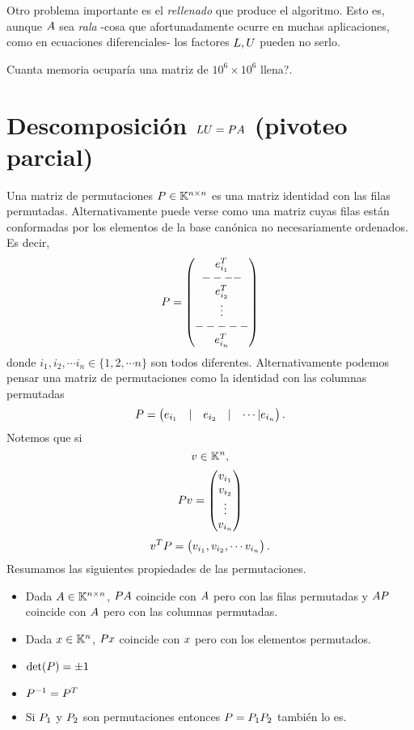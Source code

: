 \begin{tcolorbox}
Otro problema importante es el \emph{rellenado} que produce el algoritmo. Esto es, aunque $\Ab$ sea \emph{rala} -cosa que afortunadamente ocurre en muchas aplicaciones, como en ecuaciones diferenciales- los factores $\Lb,\Ub$ pueden no serlo.

\begin{ej}
 Cuanta memoria ocuparía una matriz
 de $10^6\times 10^6$ llena?.
\end{ej}



\section{Descomposición $\Lb\Ub=\Pb\Ab$ (pivoteo parcial)}

Una matriz de permutaciones $\Pb\in \Knn$
es una matriz identidad con las filas permutadas. Alternativamente puede verse como una matriz cuyas filas están conformadas por los elementos de la base canónica no necesariamente ordenados. Es decir,
$$
\Pb=
\begin{pmatrix}
 \eb_{i_1}^T \\
 ---- \\
 \eb_{i_2}^T\\
 \vdots

 \\
 -----\\
 \eb_{i_n}^T
\end{pmatrix}
$$
donde $i_1,i_2,\cdots i_n\in \{1,2,\cdots n\}$ son todos diferentes. Alternativamente podemos pensar una matriz de permutaciones como la identidad con las columnas permutadas
$$
\Pb=
\begin{pmatrix}
 \eb_{i_1}&|& \eb_{i_2}&|&\cdots |\eb_{i_n}
\end{pmatrix}.
$$
Notemos que si
$$
\vb \in \Kn,
$$
$$
\Pb\vb=
\begin{pmatrix}
 v_{i_1}\\
 v_{i_2}\\
 \vdots \\
 v_{i_n}
\end{pmatrix}
$$
$$
\vb^T\Pb=
\begin{pmatrix}
 v_{i_1},
 v_{i_2},
 \cdots
 v_{i_n}
\end{pmatrix}.
$$
Resumamos las siguientes propiedades de las permutaciones.
\begin{itemize}
 \item Dada $\Ab\in \Knn$, $\Pb\Ab$ coincide con $\Ab$ pero con las filas permutadas y $\Ab\Pb$ coincide con $\Ab$ pero con las columnas permutadas.
 \item Dada $\xb\in \Kn$, $\Pb\xb$ coincide con $\xb$ pero con los elementos permutados.
 \item $\det(\Pb)=\pm 1$
 \item $\Pb^{-1}=\Pb^T$
 \item Si $\Pb_1$ y $\Pb_2$ son permutaciones entonces $\Pb=\Pb_1\Pb_2$ también lo es.
\end{itemize}



\end{tcolorbox}
